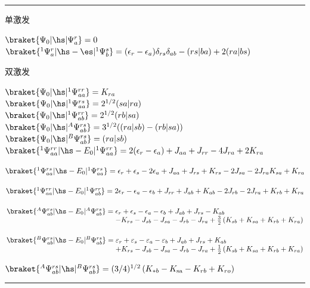 \begin{table}[H]
		\caption{{实轨道构成的}所夹的一些矩阵元.}
		\label{table4.1}
		\hrule
		\vspace{5pt}
        单激发\par
        $\braket{\Psi_0|\hs|\Psi_{a}^{r}} = 0$\\
        $\braket{^1\Psi_a^r|\hs-\es|^1\Psi_b^s} = (\epsilon_r-\epsilon_a)\delta_{rs}\delta_{ab}-(rs|ba)+2(ra|bs)$
        \par
        \mbox{}\par
        双激发\par
        $\braket{\Psi_0|\hs|^1\Psi_{aa}^{rr}}  = K_{ra}$\\
        $\braket{\Psi_0|\hs|^1\Psi_{aa}^{rs}} = 2^{1/2}(sa|ra)$\\
        $\braket{\Psi_0|\hs|^1\Psi_{ab}^{rr}} = 2^{1/2}(rb|sa)$\\
        $\braket{\Psi_0|\hs|^A\Psi_{ab}^{rs}} = 3^{1/2}((ra|sb)-(rb|sa))$\\
        $\braket{\Psi_0|\hs|^B\Psi_{ab}^{rs}} = (ra|sb)$\\
        $\braket{^1\Psi_{aa}^{rr}|\hs-E_0|^1\Psi_{aa}^{rr}} = 2(\epsilon_r-\epsilon_a) + J_{aa} + J_{rr} -4J_{ra} + 2K_{ra}
        $\par
        $\braket{^1\Psi_{aa}^{rs}|\hs-E_0|^1\Psi_{aa}^{rs}} = \epsilon_r+\epsilon_s -2\epsilon_{a}+ J_{aa} + J_{rs} +K_{rs} -2J_{sa} -2J_{ra} K_{sa} + K_{ra}
        $\par
        $\braket{^1\Psi_{aa}^{rr}|\hs-E_0|^1\Psi_{ab}^{rr}} = 2\epsilon_r-\epsilon_a -\epsilon_{b}+ J_{rr} + J_{ab} +K_{ab} -2J_{rb} -2J_{ra} + K_{rb} + K_{ra}
        $\par
        $\arraycolsep=1.4pt
        \begin{array}[t]{ll}
        	\braket{^A\Psi_{ab}^{rs}|\hs-E_0|^A\Psi_{ab}^{rs}} = & \epsilon_{r}+\epsilon_{s}-\epsilon_{a}-\epsilon_{b}+J_{a b}+J_{r s}-K_{a b}                      \\
        	                                                     & -K_{r s}-J_{s b}-J_{s a}-J_{r b}-J_{r a}+\frac{3}{2}\left(K_{s b}+K_{s a}+K_{r b}+K_{r a}\right)
        \end{array}$\par
        $\arraycolsep=1.4pt
        \begin{array}[t]{ll}
        	\braket{^B\Psi_{ab}^{rs}|\hs-E_0|^B\Psi_{ab}^{rs}} = & \varepsilon_{r}+\varepsilon_{s}-\varepsilon_{a}-\varepsilon_{b}+J_{a b}+J_{r s}+K_{a b}          \\
        	                                                     & +K_{r s}-J_{s b}-J_{s a}-J_{r b}-J_{r a}+\frac{1}{2}\left(K_{s b}+K_{s a}+K_{r b}+K_{r a}\right)
        \end{array}$\par
        $\braket{^A\Psi_{ab}^{rs}|\hs|^B\Psi_{ab}^{rs}}=(3 / 4)^{1 / 2}\left(K_{* b}-K_{\mathrm{sa}}-K_{r b}+K_{r o}\right)$
        \vspace{5pt}
		\hrule
	\end{table}


